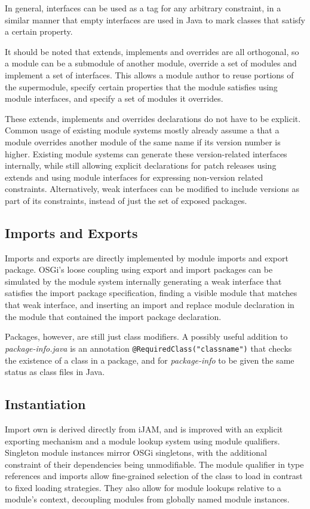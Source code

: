 In general, interfaces can be used as a tag for any arbitrary constraint, 
in a similar manner that empty interfaces are used in Java to mark classes 
that satisfy a certain property.

It should be noted that extends, implements and overrides are all orthogonal,
so a module can be a submodule of another module, override a set of modules and
implement a set of interfaces. This allows a module author to reuse portions
of the supermodule, specify certain properties that the module satisfies
using module interfaces, and specify a set of modules it overrides.

These extends, implements and overrides declarations do not have to be explicit.
Common usage of existing module systems mostly already assume a that a 
module overrides another module of the same name if its version 
number is higher. Existing module systems can generate these version-related interfaces 
internally, while still allowing explicit declarations for patch releases 
using extends and using module interfaces for expressing non-version
related constraints. Alternatively, weak interfaces can be modified to include
versions as part of its constraints, instead of just the set of exposed packages.

\subsection{Imports and Exports}

Imports and exports are directly implemented by module imports and export package.
OSGi's loose coupling using export and import packages can be simulated by
the module system internally generating a weak interface that satisfies the import
package specification, finding a visible module that matches that weak interface, and
inserting an import and replace module declaration in the module that contained the import package
declaration.

Packages, however, are still just class modifiers. A possibly useful addition to 
\textit{package-info.java} is an annotation \texttt{@RequiredClass("classname")}
that checks the existence of a class in a package, and for \textit{package-info}
to be given the same status as class files in Java.

\subsection{Instantiation}

Import own is derived directly from iJAM, and is improved with an explicit exporting 
mechanism and a module lookup system using module qualifiers. Singleton module instances mirror
OSGi singletons, with the additional constraint of their dependencies being unmodifiable. 
The module qualifier in type references and
imports allow fine-grained selection of the class to load in contrast
to fixed loading strategies. They also allow for module lookups relative to
a module's context, decoupling modules from globally named module instances.

